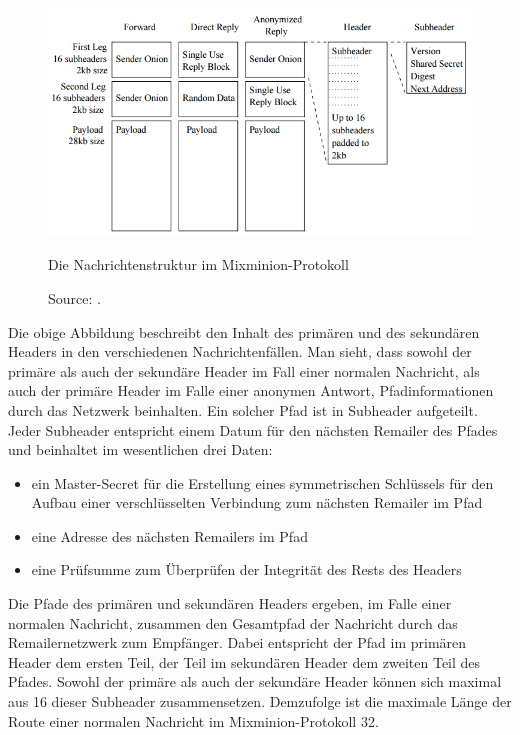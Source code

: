 \begin{figure}
	\begin{center}
		\def\svgwidth{0.9 \linewidth}
		\includegraphics[width = 0.9 \linewidth]{bilder/mixminion_structure.png}
		\caption{Die Nachrichtenstruktur im Mixminion-Protokoll}
		\caption*{\hfill Source: \cite[S. 4]{mixminion}.}
	\end{center}
\end{figure}

Die obige Abbildung beschreibt den Inhalt des primären und des sekundären Headers in den verschiedenen Nachrichtenfällen.
Man sieht, dass sowohl der primäre als auch der sekundäre Header im Fall einer normalen Nachricht, als auch der primäre Header im Falle einer anonymen Antwort, Pfadinformationen durch das Netzwerk beinhalten.
Ein solcher Pfad ist in Subheader aufgeteilt. Jeder Subheader entspricht einem Datum für den nächsten Remailer des Pfades und beinhaltet im wesentlichen drei Daten:
\begin{itemize}
\item ein Master-Secret für die Erstellung eines symmetrischen Schlüssels für den Aufbau einer verschlüsselten Verbindung zum nächsten Remailer im Pfad
\item eine Adresse des nächsten Remailers im Pfad
\item eine Prüfsumme zum Überprüfen der Integrität des Rests des Headers
\end{itemize}
Die Pfade des primären und sekundären Headers ergeben, im Falle einer normalen Nachricht, zusammen den Gesamtpfad der Nachricht durch das Remailernetzwerk zum Empfänger. Dabei entspricht der Pfad im primären Header dem ersten Teil, der Teil im sekundären Header dem zweiten Teil des Pfades.
Sowohl der primäre als auch der sekundäre Header können sich maximal aus 16 dieser Subheader zusammensetzen. Demzufolge ist die maximale Länge der Route einer normalen Nachricht im Mixminion-Protokoll 32.


